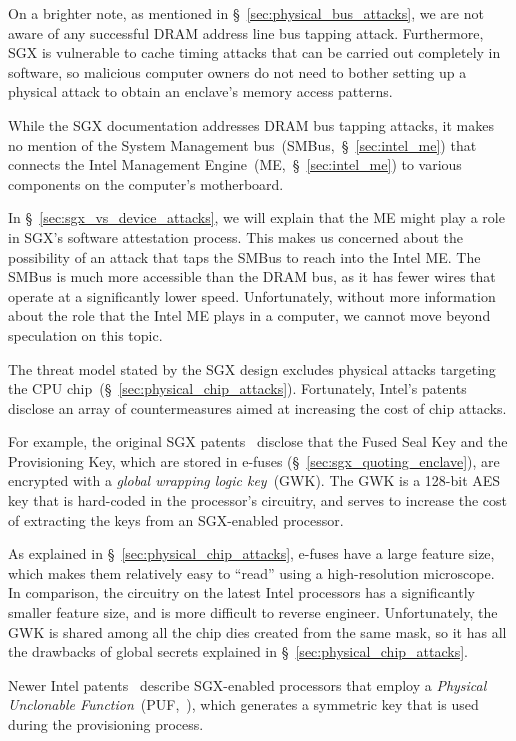 On a brighter note, as mentioned in \S~\ref{sec:physical_bus_attacks}, we are
not aware of any successful DRAM address line bus tapping attack. Furthermore,
SGX is vulnerable to cache timing attacks that can be carried out completely in
software, so malicious computer owners do not need to bother setting up a
physical attack to obtain an enclave's memory access patterns.

While the SGX documentation addresses DRAM bus tapping attacks, it makes no
mention of the System Management bus~(SMBus,~\S~\ref{sec:intel_me}) that
connects the Intel Management Engine~(ME,~\S~\ref{sec:intel_me}) to various
components on the computer's motherboard.

In \S~\ref{sec:sgx_vs_device_attacks}, we will explain that the ME might play a
role in SGX's software attestation process. This makes us concerned about the
possibility of an attack that taps the SMBus to reach into the Intel ME. The
SMBus is much more accessible than the DRAM bus, as it has fewer wires that
operate at a significantly lower speed. Unfortunately, without more information
about the role that the Intel ME plays in a computer, we cannot move beyond
speculation on this topic.

The threat model stated by the SGX design excludes physical attacks targeting
the CPU chip~(\S~\ref{sec:physical_chip_attacks}). Fortunately, Intel's patents
disclose an array of countermeasures aimed at increasing the cost of chip
attacks.

For example, the original SGX patents~\cite{intel2013patent1, intel2013patent2}
disclose that the Fused Seal Key and the Provisioning Key, which are stored in
e-fuses (\S~\ref{sec:sgx_quoting_enclave}), are encrypted with a \textit{global
wrapping logic key}~(GWK). The GWK is a 128-bit AES key that is hard-coded in
the processor's circuitry, and serves to increase the cost of extracting the
keys from an SGX-enabled processor.

As explained in \S~\ref{sec:physical_chip_attacks}, e-fuses have a large
feature size, which makes them relatively easy to ``read'' using a
high-resolution microscope. In comparison, the circuitry on the latest Intel
processors has a significantly smaller feature size, and is more difficult to
reverse engineer. Unfortunately, the GWK is shared among all the chip dies
created from the same mask, so it has all the drawbacks of global secrets
explained in \S~\ref{sec:physical_chip_attacks}.

Newer Intel patents~\cite{gotze2014provisioning, gotze2014provisioning2}
describe SGX-enabled processors that employ a
\textit{Physical Unclonable Function}~(PUF,~\cite{suh2007puf}), which
generates a symmetric key that is used during the provisioning process.

